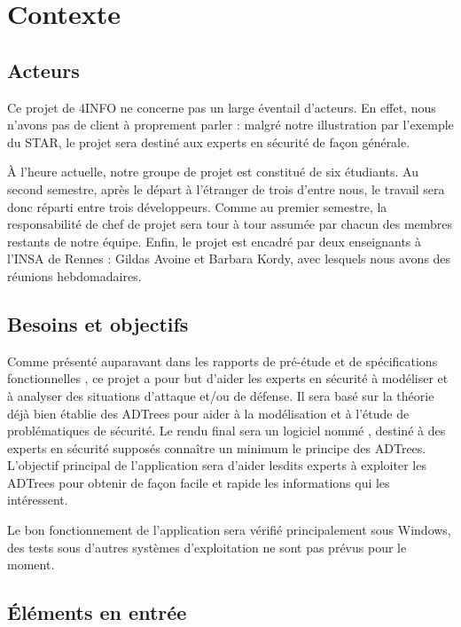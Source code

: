 \section{Contexte}
	\label{sec:contexte}


	\subsection{Acteurs}

	Ce projet de 4INFO ne concerne pas un large éventail d'acteurs. En effet, nous n'avons pas de client à proprement parler : malgré notre illustration par l'exemple du STAR, le projet sera destiné aux experts en sécurité de façon générale. 

	À l'heure actuelle, notre groupe de projet est constitué de six étudiants. Au second semestre, après le départ à l’étranger de trois d'entre nous, le travail sera donc réparti entre trois développeurs. Comme au premier semestre, la responsabilité de chef de projet sera tour à tour assumée par chacun des membres restants de notre équipe. Enfin, le projet est encadré par deux enseignants à l'INSA de Rennes : Gildas {\sc Avoine} et Barbara {\sc Kordy}, avec lesquels nous avons des réunions hebdomadaires.

	\subsection{Besoins et objectifs}

	Comme présenté auparavant dans les rapports de pré-étude %
	et de spécifications fonctionnelles %
	, ce projet a pour but d'aider les experts en sécurité à modéliser et à analyser des situations d'attaque et/ou de défense. Il sera basé sur la théorie déjà bien établie des ADTrees pour aider à la modélisation et à l'étude de problématiques de sécurité. Le rendu final sera un logiciel nommé \glasir{}, destiné à des experts en sécurité supposés connaître un minimum le principe des ADTrees. L'objectif principal de l'application sera d'aider lesdits experts à exploiter les ADTrees pour obtenir de façon facile et rapide les informations qui les intéressent.

	Le bon fonctionnement de l’application sera vérifié principalement sous Windows, des tests sous d'autres systèmes d'exploitation ne sont pas prévus pour le moment.

	\subsection{Éléments en entrée}


